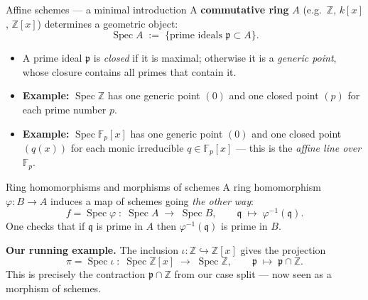 \documentclass[aspectratio=169,12pt]{beamer}
\begin{document}
\begin{frame}{Affine schemes — a minimal introduction}
  A \textbf{commutative ring} $A$ (e.g.\ $\mathbb{Z}$, $k[x]$, $\mathbb{Z}[x]$)
  determines a geometric object:
  \[
    \operatorname{Spec} A \;:=\; \{\text{prime ideals } \mathfrak{p} \subset A\}.
  \]

  \medskip

  \begin{itemize}
    \item A prime ideal $\mathfrak{p}$ is \emph{closed} if it is maximal;
          otherwise it is a \emph{generic point}, whose closure contains
          all primes that contain it.

    \smallskip

    \item \textbf{Example:} $\operatorname{Spec}\mathbb{Z}$ has one generic
          point $(0)$ and one closed point $(p)$ for each prime number $p$.

    \smallskip

    \item \textbf{Example:} $\operatorname{Spec}\mathbb{F}_p[x]$ has one generic
          point $(0)$ and one closed point $(q(x))$ for each monic irreducible
          $q \in \mathbb{F}_p[x]$ — this is the \emph{affine line over
          $\mathbb{F}_p$}.
  \end{itemize}
\end{frame}

\begin{frame}{Ring homomorphisms and morphisms of schemes}
  A ring homomorphism $\varphi : B \to A$ induces a map of schemes
  going \emph{the other way}:
  \[
    f = \operatorname{Spec}\varphi \;:\;
    \operatorname{Spec} A \;\longrightarrow\; \operatorname{Spec} B,
    \qquad
    \mathfrak{q} \;\longmapsto\; \varphi^{-1}(\mathfrak{q}).
  \]
  One checks that if $\mathfrak{q}$ is prime in $A$ then
  $\varphi^{-1}(\mathfrak{q})$ is prime in $B$.

  \bigskip

  \textbf{Our running example.}\enspace
  The inclusion $\iota : \mathbb{Z} \hookrightarrow \mathbb{Z}[x]$
  gives the projection
  \[
    \pi = \operatorname{Spec}\iota \;:\;
    \operatorname{Spec}\mathbb{Z}[x] \;\longrightarrow\; \operatorname{Spec}\mathbb{Z},
    \qquad
    \mathfrak{p} \;\longmapsto\; \mathfrak{p} \cap \mathbb{Z}.
  \]
  This is precisely the contraction $\mathfrak{p} \cap \mathbb{Z}$ from our
  case split — now seen as a morphism of schemes.
\end{frame}
\end{document}
